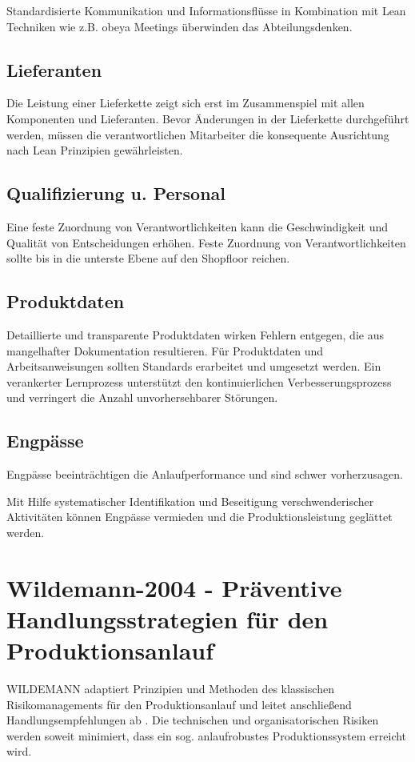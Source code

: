 Standardisierte Kommunikation und Informationsflüsse in Kombination mit Lean Techniken wie z.B. \gls{obeya} Meetings überwinden das Abteilungsdenken. 

\subsection{Lieferanten}
Die Leistung einer Lieferkette zeigt sich erst im Zusammenspiel mit allen Komponenten und Lieferanten. 
Bevor Änderungen in der Lieferkette durchgeführt werden, müssen die verantwortlichen Mitarbeiter die konsequente Ausrichtung nach Lean Prinzipien gewährleisten. 

\subsection{Qualifizierung u. Personal}
Eine feste Zuordnung von Verantwortlichkeiten kann die Geschwindigkeit und Qualität von Entscheidungen erhöhen. 
Feste Zuordnung von Verantwortlichkeiten sollte bis in die unterste Ebene auf den Shopfloor reichen.

\subsection{Produktdaten}
Detaillierte und transparente Produktdaten wirken Fehlern entgegen, die aus mangelhafter Dokumentation resultieren. 
Für Produktdaten und Arbeitsanweisungen sollten Standards erarbeitet und umgesetzt werden. Ein verankerter Lernprozess unterstützt den kontinuierlichen Verbesserungsprozess und verringert die Anzahl unvorhersehbarer Störungen. 

\subsection{Engpässe}
Engpässe beeinträchtigen die Anlaufperformance und sind schwer vorherzusagen. 

Mit Hilfe systematischer Identifikation und Beseitigung verschwenderischer Aktivitäten können Engpässe vermieden und die Produktionsleistung geglättet werden. 

\section{Wildemann-2004 - Präventive Handlungsstrategien für den Produktionsanlauf}

WILDEMANN adaptiert Prinzipien und Methoden des klassischen Risikomanagements für den Produktionsanlauf und leitet anschließend Handlungsempfehlungen ab \cite{Wildemann2004}. Die technischen und organisatorischen Risiken werden soweit minimiert, dass ein sog. anlaufrobustes Produktionssystem erreicht wird. 

